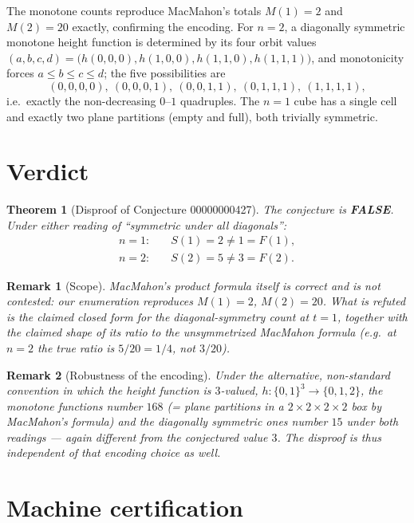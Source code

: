 \documentclass[11pt]{article}
\newtheorem{theorem}{Theorem}
\newtheorem{remark}{Remark}
\begin{document}
The monotone counts reproduce MacMahon's totals $M(1)=2$ and $M(2)=20$
exactly, confirming the encoding.  For $n=2$, a diagonally symmetric
monotone height function is determined by its four orbit values
$(a,b,c,d)=\bigl(h(0,0,0),h(1,0,0),h(1,1,0),h(1,1,1)\bigr)$, and monotonicity
forces $a\le b\le c\le d$; the five possibilities are
\[
(0,0,0,0),\ (0,0,0,1),\ (0,0,1,1),\ (0,1,1,1),\ (1,1,1,1),
\]
i.e.\ exactly the non-decreasing $0$--$1$ quadruples.  The $n=1$ cube has a
single cell and exactly two plane partitions (empty and full), both trivially
symmetric.

\section{Verdict}

\begin{theorem}[Disproof of Conjecture 00000000427]
The conjecture is \textbf{FALSE}.  Under either reading of ``symmetric under
all diagonals'':
\begin{align*}
n=1:&\quad S(1)=2\neq 1=F(1),\\
n=2:&\quad S(2)=5\neq 3=F(2).
\end{align*}
\end{theorem}

\begin{remark}[Scope]
MacMahon's product formula itself is correct and is not contested: our
enumeration reproduces $M(1)=2$, $M(2)=20$.  What is refuted is the claimed
closed form for the \emph{diagonal-symmetry} count at $t=1$, together with the
claimed shape of its ratio to the unsymmetrized MacMahon formula (e.g.\ at
$n=2$ the true ratio is $5/20=1/4$, not $3/20$).
\end{remark}

\begin{remark}[Robustness of the encoding]
Under the alternative, non-standard convention in which the height function is
$3$-valued, $h:\{0,1\}^3\to\{0,1,2\}$, the monotone functions number $168$
(= plane partitions in a $2\times2\times2\times2$ box by MacMahon's formula)
and the diagonally symmetric ones number $15$ under both readings --- again
different from the conjectured value $3$.  The disproof is thus independent of
that encoding choice as well.
\end{remark}

\section{Machine certification}
\end{document}
